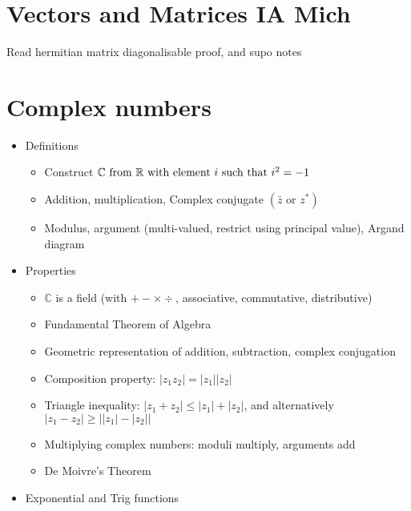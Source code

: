 



\section*{Vectors and Matrices \hfill IA Mich}

Read hermitian matrix diagonalisable proof, and supo notes

\section{Complex numbers}
\begin{itemize}
      \item Definitions
            \begin{itemize}
                  \item Construct $\mathbb{C}\textrm{ from \ensuremath{\mathbb{R}} with element \ensuremath{i} such that }i^{2}=-1$
                  \item Addition, multiplication, Complex conjugate $(\bar{z}\textrm{ or }z^{*})$
                  \item Modulus, argument (multi-valued, restrict using principal value),
                        Argand diagram
            \end{itemize}
      \item Properties
            \begin{itemize}
                  \item $\mathbb{C}$ is a field (with $+ - \times \div $, associative, commutative,
                        distributive)
                  \item Fundamental Theorem of Algebra
                  \item Geometric representation of addition, subtraction, complex conjugation
                  \item Composition property: $|z_{1}z_{2}|=|z_{1}||z_{2}|$
                  \item Triangle inequality: $|z_{1}+z_{2}|\leq|z_{1}|+|z_{2}|$, and alternatively
                        $|z_{1}-z_{2}|\geq\left||z_{1}|-|z_{2}|\right|$
                  \item Multiplying complex numbers: moduli multiply, arguments add
                  \item De Moivre's Theorem
            \end{itemize}
      \item Exponential and Trig functions
            \begin{itemize}

\end{itemize}
\end{itemize}
